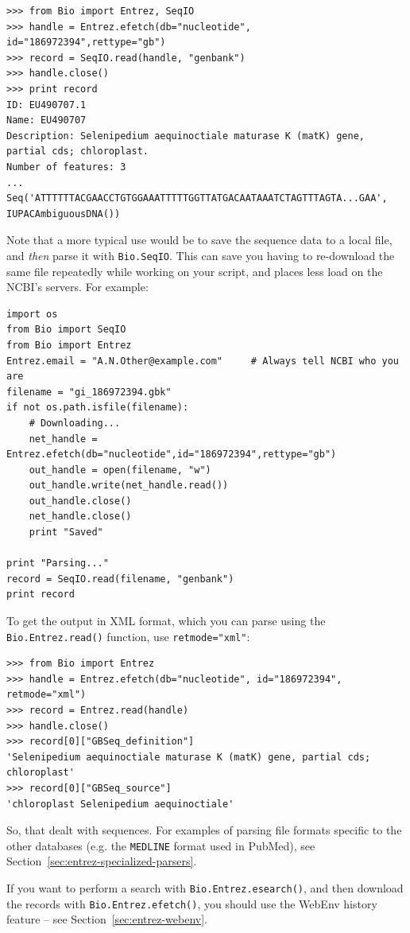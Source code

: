 \documentclass{report}
\begin{document}
\begin{verbatim}
>>> from Bio import Entrez, SeqIO
>>> handle = Entrez.efetch(db="nucleotide", id="186972394",rettype="gb")
>>> record = SeqIO.read(handle, "genbank")
>>> handle.close()
>>> print record
ID: EU490707.1
Name: EU490707
Description: Selenipedium aequinoctiale maturase K (matK) gene, partial cds; chloroplast.
Number of features: 3
...
Seq('ATTTTTTACGAACCTGTGGAAATTTTTGGTTATGACAATAAATCTAGTTTAGTA...GAA', IUPACAmbiguousDNA())\end{verbatim}

Note that a more typical use would be to save the sequence data to a local file, and \emph{then} parse it with \verb|Bio.SeqIO|.  This can save you having to re-download the same file repeatedly while working on your script, and places less load on the NCBI's servers.  For example:

\begin{verbatim}
import os
from Bio import SeqIO
from Bio import Entrez
Entrez.email = "A.N.Other@example.com"     # Always tell NCBI who you are
filename = "gi_186972394.gbk"
if not os.path.isfile(filename):
    # Downloading...
    net_handle = Entrez.efetch(db="nucleotide",id="186972394",rettype="gb")
    out_handle = open(filename, "w")
    out_handle.write(net_handle.read())
    out_handle.close()
    net_handle.close()
    print "Saved"

print "Parsing..."
record = SeqIO.read(filename, "genbank")
print record
\end{verbatim}

To get the output in XML format, which you can parse using the \verb+Bio.Entrez.read()+ function, use \verb+retmode="xml"+:

\begin{verbatim}
>>> from Bio import Entrez
>>> handle = Entrez.efetch(db="nucleotide", id="186972394", retmode="xml")
>>> record = Entrez.read(handle)
>>> handle.close()
>>> record[0]["GBSeq_definition"] 
'Selenipedium aequinoctiale maturase K (matK) gene, partial cds; chloroplast'
>>> record[0]["GBSeq_source"] 
'chloroplast Selenipedium aequinoctiale'
\end{verbatim}

So, that dealt with sequences. For examples of parsing file formats specific to the other databases (e.g. the \verb+MEDLINE+ format used in PubMed), see Section~\ref{sec:entrez-specialized-parsers}.

If you want to perform a search with \verb|Bio.Entrez.esearch()|, and then download the records with \verb|Bio.Entrez.efetch()|, you should use the WebEnv history feature -- see Section~\ref{sec:entrez-webenv}.
\end{document}
